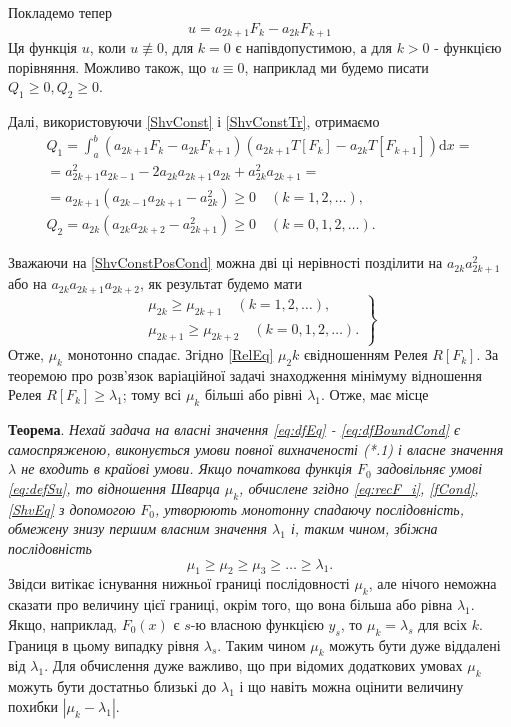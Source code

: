 \documentclass[12pt,a4paper]{article}
\begin{document}
Покладемо тепер
\[
	u = a_{2k+1} F_k - a_{2k} F_{k+1}
\]
Ця функція $u$, коли $u \not\equiv 0$, для $k=0$ є напівдопустимою, а для $k>0$ - функцією порівняння. Можливо також, що $u \equiv 0$, наприклад ми будемо писати $Q_1 \geq 0, Q_2 \geq 0$.

Далі, використовуючи \eqref{ShvConst} і \eqref{ShvConstTr}, отримаємо
\[
\begin{array}{l}
	Q_1 = \int_a^b (a_{2k+1} F_k - a_{2k} F_{k+1})(a_{2k+1} T[F_k] - a_{2k} T[F_{k+1}]) \mathrm{d}x = \\
= a_{2k+1}^2 a_{2k-1} - 2 a_{2k} a_{2k+1} a_{2k} + a_{2k}^2 a_{2k+1} = \\
= a_{2k+1}(a_{2k-1} a_{2k+1} - a_{2k}^2) \geq 0 \quad (k=1,2,\dots), \\
Q_2 = a_{2k}(a_{2k} a_{2k+2} - a_{2k+1}^2) \geq 0 \quad (k=0,1,2,\dots).
\end{array}
\]

Зважаючи на \eqref{ShvConstPosCond} можна дві ці нерівності позділити на $a_{2k} a_{2k+1}^2$ або на $a_{2k} a_{2k+1} a_{2k+2}$, як результат будемо мати
\begin{equation}\label{eq:ShvMuDecr}
\left. \begin{array}{l}
		\mu_{2k} \geq \mu_{2k+1} \quad (k=1,2,\dots), \\
		\mu_{2k+1} \geq \mu_{2k+2} \quad (k=0,1,2,\dots).
\end{array} \right\}
\end{equation}
Отже, $\mu_k$ монотонно спадає. Згідно \eqref{RelEq} $\mu_2k$ євідношенням Релея $R[F_k]$. За теоремою про розв’язок варіаційної задачі знаходження мінімуму відношення Релея $R[F_k] \geq \lambda_1$; тому всі $\mu_k$ більші або рівні $\lambda_1$.
Отже, має місце

\textbf{Теорема}. \emph{Нехай задача на власні значення \eqref{eq:dfEq} - \eqref{eq:dfBoundCond} є самоспряженою, виконується умови повної вихначеності (*.1) і власне значення $\lambda$ не входить в крайові умови. Якщо початкова функція $F_0$ задовільняє умові \eqref{eq:defSu}, то відношення Шварца $\mu_k$, обчислене згідно \eqref{eq:recF_i}, \eqref{fCond}, \eqref{ShvEq} з допомогою $F_0$, утворюють монотонну спадаючу послідовність, обмежену знизу першим власним значення $\lambda_1$ і, таким чином, збіжна послідовність 
\begin{equation}\label{eq:ShvLim}
	\mu_1 \geq \mu_2 \geq \mu_3 \geq \dots \geq \lambda_1 .
\end{equation}}
Звідси витікає існування нижньої границі послідовності $\mu_k$, але нічого неможна сказати про величину цієї границі, окрім того, що вона більша або рівна $\lambda_1$. Якщо, наприклад, $F_0(x)$ є $s$-ю власною функцією $y_s$, то $\mu_k = \lambda_s$ для всіх $k$. Границя в цьому випадку рівня $\lambda_s$. Таким чином $\mu_k$ можуть бути дуже віддалені від $\lambda_1$. Для обчислення дуже важливо, що при відомих додаткових умовах $\mu_k$ можуть бути достатньо близькі до $\lambda_1$ і що навіть можна оцінити величину похибки $|\mu_k - \lambda_1|$.
\end{document}
